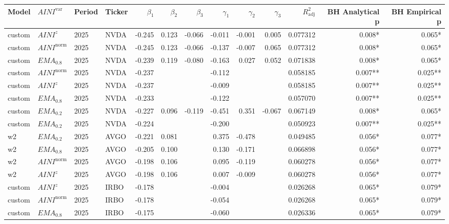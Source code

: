 \setlength\tabcolsep{2.0pt}
\scriptsize

\begin{tabular}{@{}llllrrrrrrrrr@{}}
\toprule
Model & $AINI^{\mathrm{var}}$ & Period & Ticker & $\beta_{1}$ & $\beta_{2}$ & $\beta_{3}$ & $\gamma_{1}$ & $\gamma_{2}$ & $\gamma_{3}$ & $R^{2}_{\mathrm{adj}}$ & BH Analytical p & BH Empirical p \\
\midrule
custom & $AINI^{z}$ & 2025 & NVDA & -0.245 & 0.123 & -0.066 & -0.011 & -0.001 & 0.005 & 0.077312 & 0.008* & 0.065* \\
custom & $AINI^{\mathrm{norm}}$ & 2025 & NVDA & -0.245 & 0.123 & -0.066 & -0.137 & -0.007 & 0.065 & 0.077312 & 0.008* & 0.065* \\
custom & $EMA_{0.8}$ & 2025 & NVDA & -0.239 & 0.119 & -0.080 & -0.163 & 0.027 & 0.052 & 0.071838 & 0.008* & 0.065* \\
custom & $AINI^{\mathrm{norm}}$ & 2025 & NVDA & -0.237 &  &  & -0.112 &  &  & 0.058185 & 0.007** & 0.025** \\
custom & $AINI^{z}$ & 2025 & NVDA & -0.237 &  &  & -0.009 &  &  & 0.058185 & 0.007** & 0.025** \\
custom & $EMA_{0.8}$ & 2025 & NVDA & -0.233 &  &  & -0.122 &  &  & 0.057070 & 0.007** & 0.025** \\
custom & $EMA_{0.2}$ & 2025 & NVDA & -0.227 & 0.096 & -0.119 & -0.451 & 0.351 & -0.067 & 0.067149 & 0.008* & 0.065* \\
custom & $EMA_{0.2}$ & 2025 & NVDA & -0.224 &  &  & -0.200 &  &  & 0.050923 & 0.007** & 0.025** \\
w2 & $EMA_{0.2}$ & 2025 & AVGO & -0.221 & 0.081 &  & 0.375 & -0.478 &  & 0.049485 & 0.056* & 0.077* \\
w2 & $EMA_{0.8}$ & 2025 & AVGO & -0.205 & 0.100 &  & 0.130 & -0.171 &  & 0.066898 & 0.056* & 0.077* \\
w2 & $AINI^{\mathrm{norm}}$ & 2025 & AVGO & -0.198 & 0.106 &  & 0.095 & -0.119 &  & 0.060278 & 0.056* & 0.077* \\
w2 & $AINI^{z}$ & 2025 & AVGO & -0.198 & 0.106 &  & 0.007 & -0.009 &  & 0.060278 & 0.056* & 0.077* \\
custom & $AINI^{z}$ & 2025 & IRBO & -0.178 &  &  & -0.004 &  &  & 0.026268 & 0.065* & 0.079* \\
custom & $AINI^{\mathrm{norm}}$ & 2025 & IRBO & -0.178 &  &  & -0.054 &  &  & 0.026268 & 0.065* & 0.079* \\
custom & $EMA_{0.8}$ & 2025 & IRBO & -0.175 &  &  & -0.060 &  &  & 0.026336 & 0.065* & 0.079* \\

\end{tabular}
